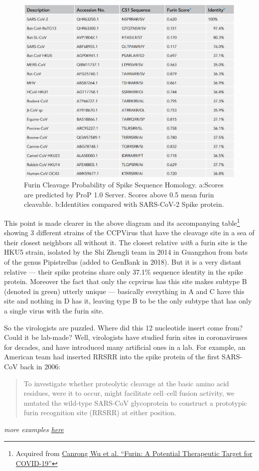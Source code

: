 \documentclass[11pt]{article}
\begin{document}
\begin{figure}[htbp]
\centering
\includegraphics[width=.9\linewidth]{./images/furin-scores.png}
\caption{Furin Cleavage Probability of Spike Sequence Homology. a:Scores are predicted by ProP 1.0 Server. Scores above 0.5 mean furin cleavable. b:Identities compared with SARS-CoV-2 Spike protein.}
\end{figure}

This point is made clearer in the above diagram and its accompanying table\footnote{Acquired from \href{https://www.cell.com/action/showPdf?pii=S2589-0042\%2820\%2930834-8}{Canrong Wu et al. ``Furin: A Potential Therapeutic Target for COVID-19''}} showing 3 different strains of the CCPVirus that have the cleavage site in a sea of their closest neighbors all without it. The closest relative \emph{with} a furin site is the HKU5 strain, isolated by the Shi Zhengli team in 2014 in Guangzhou from bats of the genus Pipistrellus (added to GenBank in 2018). But it is a very distant relative --- their spike proteins share only 37.1\% sequence identity in the spike protein. Moreover the fact that only the ccpvirus has this site makes subtype B (denoted in green) utterly unique --- basically everything in A and C have this site and nothing in D has it, leaving type B to be the only subtype that has only a single virus with the furin site.

So the virologists are puzzled. Where did this 12 nucleotide insert come from? Could it be lab-made? Well, virologists have studied furin sites in coronaviruses for decades, and have introduced many artificial ones in a lab. For example, an American team had inserted RRSRR into the spike protein of the first SARS-CoV back in 2006:
\begin{quote}
To investigate whether proteolytic cleavage at the basic amino acid residues, were it to occur, might facilitate cell–cell fusion activity, we mutated the wild-type SARS-CoV glycoprotein to construct a prototypic furin recognition site (RRSRR) at either position.
\end{quote}
\emph{more examples \href{https://yurideigin.medium.com/lab-made-cov2-genealogy-through-the-lens-of-gain-of-function-research-f96dd7413748}{here}}
\end{document}
